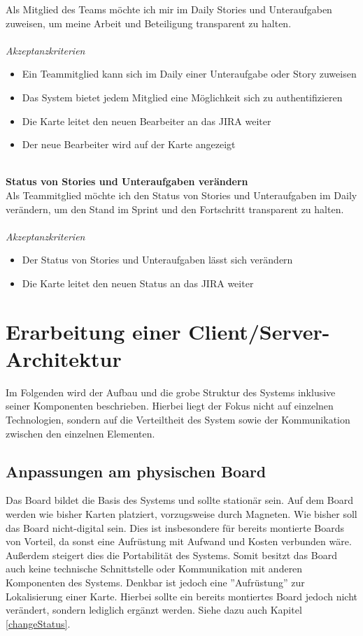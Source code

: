 \documentclass[12pt,titlepage]{scrartcl}
\begin{document}
	Als Mitglied des Teams möchte ich mir im Daily Stories und Unteraufgaben zuweisen, um meine Arbeit und Beteiligung transparent zu halten. \\ \\
	\textit{Akzeptanzkriterien}
	\begin{itemize}
		\setlength\itemsep{0em}
		\item Ein Teammitglied kann sich im Daily einer Unteraufgabe oder Story zuweisen
		\item Das System bietet jedem Mitglied eine Möglichkeit sich zu authentifizieren
		\item Die Karte leitet den neuen Bearbeiter an das JIRA weiter
		\item Der neue Bearbeiter wird auf der Karte angezeigt
	\end{itemize}
	\noindent
	\\ \textbf{Status von Stories und Unteraufgaben verändern} \\
	Als Teammitglied möchte ich den Status von Stories und Unteraufgaben im Daily verändern, um den Stand im Sprint und den Fortschritt transparent zu halten.\\ \\
	\textit{Akzeptanzkriterien}
	\begin{itemize}
		\setlength\itemsep{0em}
		\item Der Status von Stories und Unteraufgaben lässt sich verändern
		\item Die Karte leitet den neuen Status an das JIRA weiter
	\end{itemize}

	\newpage	
	\section{Erarbeitung einer Client/Server-Architektur}
	Im Folgenden wird der Aufbau und die grobe Struktur des Systems inklusive seiner Komponenten beschrieben. Hierbei liegt der Fokus nicht auf einzelnen Technologien, sondern auf die Verteiltheit des System sowie der Kommunikation zwischen den einzelnen Elementen.
		\subsection{Anpassungen am physischen Board}
		Das Board bildet die Basis des Systems und sollte stationär sein. Auf dem Board werden wie bisher Karten platziert, vorzugsweise durch Magneten. Wie bisher soll das Board nicht-digital sein. Dies ist insbesondere für bereits montierte Boards von Vorteil, da sonst eine Aufrüstung mit Aufwand und Kosten verbunden wäre. Außerdem steigert dies die Portabilität des Systems. Somit besitzt das Board auch keine technische Schnittstelle oder Kommunikation mit anderen Komponenten des Systems. Denkbar ist jedoch eine ''Aufrüstung'' zur Lokalisierung einer Karte. Hierbei sollte ein bereits montiertes Board jedoch nicht verändert, sondern lediglich ergänzt werden. Siehe dazu auch Kapitel \ref{changeStatus}.
\end{document}
